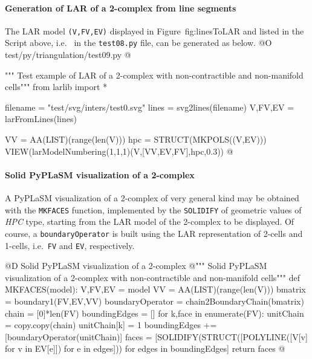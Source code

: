 \documentclass[11pt,oneside]{article}	%
\begin{document}
\paragraph{Generation of LAR of a 2-complex from line segments}
The LAR model \texttt{(V,FV,EV)} displayed in Figure~fig:linesToLAR and listed in the Script above, 
i.e.~ in the \texttt{test08.py} file, can be generated as below.
@O test/py/triangulation/test09.py
@{""" Test example of LAR of a 2-complex with non-contractible and non-manifold cells"""
from larlib import *

filename = "test/svg/inters/test0.svg"
lines = svg2lines(filename)
V,FV,EV = larFromLines(lines)

VV = AA(LIST)(range(len(V)))
hpc = STRUCT(MKPOLS((V,EV)))        
VIEW(larModelNumbering(1,1,1)(V,[VV,EV,FV],hpc,0.3)) 
@}


\paragraph{Solid PyPLaSM visualization of a 2-complex}

A PyPLaSM visualization of a 2-complex of very general kind may be obtained with the \texttt{MKFACES} function, implemented by the \texttt{SOLIDIFY} of geometric values of \emph{HPC} type, starting from the LAR model of the 2-complex to be displayed. Of course, a \texttt{boundaryOperator} is built using the LAR representation of 2-cells and 1-cells, i.e.~\texttt{FV} and \texttt{EV}, respectively.

@D Solid PyPLaSM visualization of a 2-complex
@{""" Solid PyPLaSM visualization of a 2-complex with non-contractible 
      and non-manifold cells"""
def MKFACES(model):
    V,FV,EV = model
    VV = AA(LIST)(range(len(V)))
    bmatrix = boundary1(FV,EV,VV)
    boundaryOperator = chain2BoundaryChain(bmatrix)
    chain = [0]*len(FV)
    boundingEdges = []
    for k,face in enumerate(FV):
    	unitChain = copy.copy(chain)
    	unitChain[k] = 1
    	boundingEdges += [boundaryOperator(unitChain)]
    faces = [SOLIDIFY(STRUCT([POLYLINE([V[v] for v in EV[e]]) for e in edges])) 
        for edges in boundingEdges]
    return faces
@}
\end{document}
